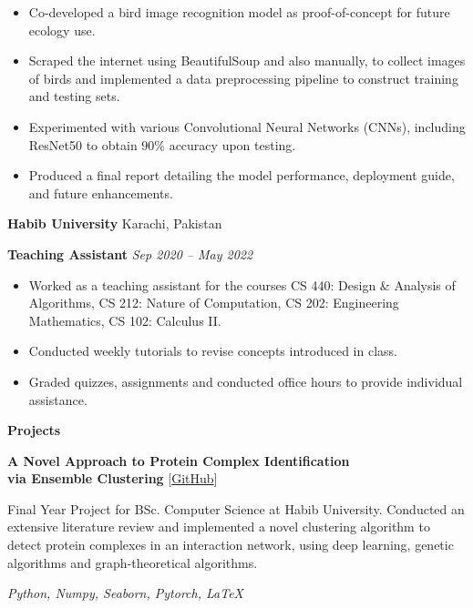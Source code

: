\documentclass[12pt, a4paper]{article}
\begin{document}
\begin{itemize}[noitemsep, topsep=0pt, partopsep=0pt, parsep=0pt]
	\item Co-developed a bird image recognition model as proof-of-concept for future ecology use.
	\item Scraped the internet using BeautifulSoup and also manually, to collect images of birds and implemented a data preprocessing pipeline to construct training and testing sets.
	\item Experimented with various Convolutional Neural Networks (CNNs), including ResNet50 to obtain 90\% accuracy upon testing.
	\item Produced a final report detailing the model performance, deployment guide, and future enhancements.
\end{itemize}

\vspace{12pt}
\textbf{Habib University} \hfill Karachi, Pakistan

\textbf{Teaching Assistant} \hfill \textit{Sep 2020 -- May 2022}

\begin{itemize}[noitemsep, topsep=0pt, partopsep=0pt, parsep=0pt]
	\item Worked as a teaching assistant for the courses CS 440: Design \& Analysis of Algorithms, CS 212: Nature of Computation, CS 202: Engineering Mathematics, CS 102: Calculus II.
	\item Conducted weekly tutorials to revise concepts introduced in class.
	\item Graded quizzes, assignments and conducted office hours to provide individual assistance.
\end{itemize}


\begin{center}
	\large\textbf{Projects}
\end{center}
\textbf{A Novel Approach to Protein Complex Identification \\ via Ensemble Clustering}	\hfill [\href{https://github.com/hurryingauto3/PPI-Complex-Prediction}{GitHub}]
\begin{center}
	\parbox{0.9\linewidth}{
		Final Year Project for BSc. Computer Science at Habib University. Conducted an extensive literature review and implemented a novel clustering algorithm to detect protein complexes in an interaction network, using deep learning, genetic algorithms and graph-theoretical algorithms.

		\textit{Python, Numpy, Seaborn, Pytorch, \LaTeX}
	}
\end{center}
\end{document}
